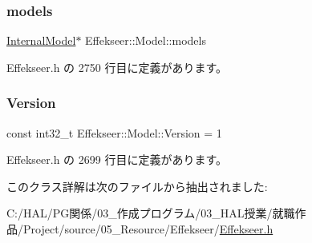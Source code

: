 \subsubsection{\texorpdfstring{models}{models}}
{\footnotesize\ttfamily \mbox{\hyperlink{struct_effekseer_1_1_model_1_1_internal_model}{Internal\+Model}}$\ast$ Effekseer\+::\+Model\+::models\hspace{0.3cm}{\ttfamily [private]}}



 Effekseer.\+h の 2750 行目に定義があります。

\mbox{\label{class_effekseer_1_1_model_a9f5c2f10fde65efeb5bc603ed9d6436e}} 
\subsubsection{\texorpdfstring{Version}{Version}}
{\footnotesize\ttfamily const int32\+\_\+t Effekseer\+::\+Model\+::\+Version = 1\hspace{0.3cm}{\ttfamily [static]}}



 Effekseer.\+h の 2699 行目に定義があります。



このクラス詳解は次のファイルから抽出されました\+:\begin{DoxyCompactItemize}
\item 
C\+:/\+H\+A\+L/\+P\+G関係/03\+\_\+作成プログラム/03\+\_\+\+H\+A\+L授業/就職作品/\+Project/source/05\+\_\+\+Resource/\+Effekseer/\mbox{\hyperlink{_effekseer_8h}{Effekseer.\+h}}\end{DoxyCompactItemize}
